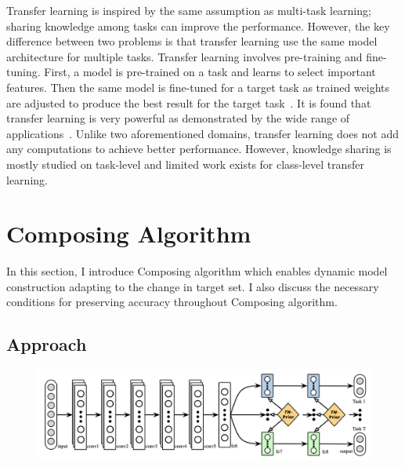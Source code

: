 \documentclass{article}
\begin{document}
Transfer learning is inspired by the same assumption as multi-task learning; sharing knowledge among tasks can improve the performance. However, the key difference between two problems is that transfer learning use the same model architecture for multiple tasks. Transfer learning involves pre-training and fine-tuning. First, a model is pre-trained on a task and learns to select important features. Then the same model is fine-tuned for a target task as trained weights are adjusted to produce the best result for the target task~\cite{yosinski2014transferable}. It is found that transfer learning is very powerful as demonstrated by the wide range of applications~\cite{raina2007self, egan2004effects, glorot2011domain}. Unlike two aforementioned domains, transfer learning does not add any computations to achieve better performance. However, knowledge sharing is mostly studied on task-level and limited work exists for class-level transfer learning.

\section{Composing Algorithm}

In this section, I introduce Composing algorithm which enables dynamic model construction adapting to the change in target set. I also discuss the necessary conditions for preserving accuracy throughout Composing algorithm.

\subsection{Approach}

\begin{figure}[t!]
  \centering
  \includegraphics[scale=0.25,trim={0mm 0mm 0mm 0mm},clip]{long2017learning.png}
\end{figure}
\end{document}
